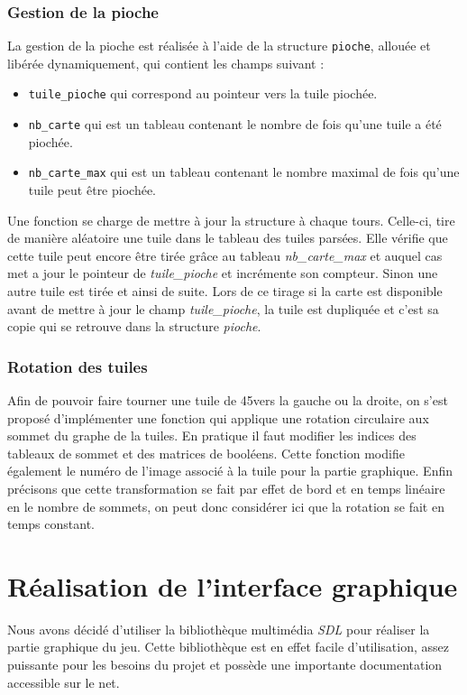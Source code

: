 \documentclass[a4paper, 11pt]{article}
\begin{document}
		\subsubsection{Gestion de la pioche}\label{sec:autre-fct-pioche}
			\indent La gestion de la pioche est réalisée à l'aide de la structure \verb!pioche!, allouée et libérée dynamiquement, qui contient les champs suivant : 
			\begin{itemize}
				\item \verb!tuile_pioche! qui correspond au pointeur vers la tuile piochée.
				\item \verb!nb_carte! qui est un tableau contenant le nombre de fois qu'une tuile a été piochée.
				\item \verb!nb_carte_max! qui est un tableau contenant le nombre maximal de fois qu'une tuile peut être piochée.
			\end{itemize}
			Une fonction se charge de mettre à jour la structure à chaque tours. Celle-ci, tire de manière aléatoire une tuile dans le tableau des tuiles parsées. Elle vérifie que cette tuile peut encore être tirée grâce au tableau \emph{nb\_carte\_max} et auquel cas met a jour le pointeur de \emph{tuile\_pioche} et incrémente son compteur. Sinon une autre tuile est tirée et ainsi de suite. Lors de ce tirage si la carte est disponible avant de mettre à jour le champ \emph{tuile\_pioche}, la tuile est dupliquée et c'est sa copie qui se retrouve dans la structure \emph{pioche}.


		\subsubsection{Rotation des tuiles}
		Afin de pouvoir faire tourner une tuile de 45\degre vers la gauche ou la droite, on s'est proposé d'implémenter une fonction qui applique une rotation circulaire aux sommet du graphe de la tuiles. En pratique il faut modifier les indices des tableaux de sommet et des matrices de booléens. Cette fonction modifie également le numéro de l'image associé à la tuile pour la partie graphique. Enfin précisons que cette transformation se fait par effet de bord et en temps linéaire en le nombre de sommets, on peut donc considérer ici que la rotation se fait en temps constant.


\newpage			
 
 

 

\section{Réalisation de l'interface graphique}
\indent Nous avons décidé d'utiliser la bibliothèque multimédia \emph{SDL} pour réaliser la partie graphique du jeu. Cette bibliothèque est en effet facile d'utilisation, assez puissante pour les besoins du projet et possède une importante documentation accessible sur le net. \
\end{document}
